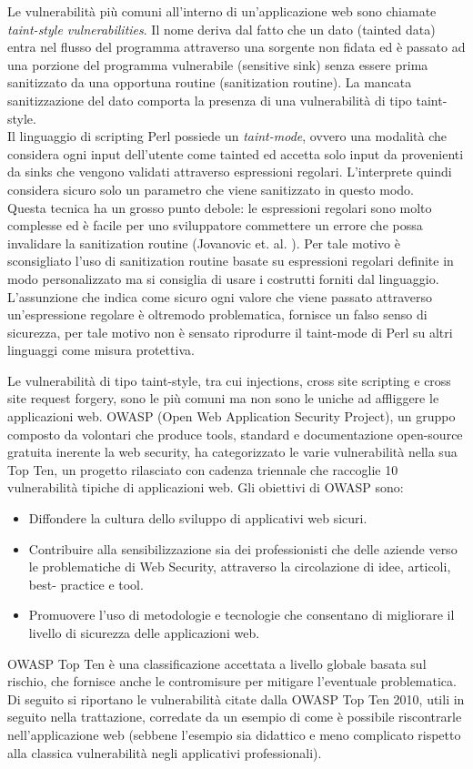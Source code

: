Le vulnerabilità più comuni all'interno di un'applicazione web sono chiamate \emph{taint-style vulnerabilities}. Il nome deriva dal fatto che un dato (tainted data) entra nel flusso del programma attraverso una sorgente non fidata ed è passato ad una porzione del programma vulnerabile (sensitive sink) senza essere prima sanitizzato da una opportuna routine (sanitization routine). La mancata sanitizzazione del dato comporta la presenza di una vulnerabilità di tipo taint-style.\\
Il linguaggio di scripting Perl possiede un \emph{taint-mode}, ovvero una modalità che considera ogni input dell'utente come tainted ed accetta solo input da provenienti da sinks che vengono validati attraverso espressioni regolari. L'interprete quindi considera sicuro solo un parametro che viene sanitizzato in questo modo.\\
Questa tecnica ha un grosso punto debole: le espressioni regolari sono molto complesse ed è facile per uno sviluppatore commettere un errore che possa invalidare la sanitization routine (Jovanovic et. al. \cite{CITAZIONE}). Per tale motivo è sconsigliato l'uso di sanitization routine basate su espressioni regolari definite in modo personalizzato ma si consiglia di usare i costrutti forniti dal linguaggio. \\
L'assunzione che indica come sicuro ogni valore che viene passato attraverso un'espressione regolare è oltremodo problematica, fornisce un falso senso di sicurezza, per tale motivo non è sensato riprodurre il taint-mode di Perl su altri linguaggi come misura protettiva.

Le vulnerabilità di tipo taint-style, tra cui injections, cross site scripting e cross site request forgery, sono le più comuni ma non sono le uniche ad affliggere le applicazioni web.
OWASP (Open Web Application Security Project), un gruppo composto da volontari che produce tools, standard e documentazione open-source gratuita inerente la web security, ha categorizzato le varie vulnerabilità nella sua Top Ten, un progetto rilasciato con cadenza triennale che raccoglie 10 vulnerabilità tipiche di applicazioni web. 
Gli obiettivi di OWASP sono:
\begin{itemize}
\item Diffondere la cultura dello sviluppo di applicativi web sicuri.
\item Contribuire alla sensibilizzazione sia dei professionisti che delle aziende verso le problematiche di Web Security, attraverso la circolazione di idee, articoli, best- practice e tool.
\item Promuovere l’uso di metodologie e tecnologie che consentano di migliorare il livello di sicurezza delle applicazioni web.
\end{itemize}
OWASP Top Ten è una classificazione accettata a livello globale basata sul rischio, che fornisce anche le contromisure per mitigare l'eventuale problematica. Di seguito si riportano le vulnerabilità citate dalla OWASP Top Ten 2010, utili in seguito nella trattazione, corredate da un esempio di come è possibile riscontrarle nell'applicazione web (sebbene l'esempio sia didattico e meno complicato rispetto alla classica vulnerabilità negli applicativi professionali).


